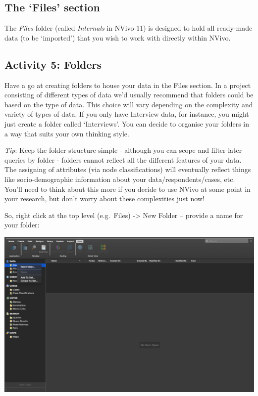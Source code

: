 \documentclass[
]{book}
\begin{document}
\hypertarget{the-files-section}{%
\subsection{The `Files' section}\label{the-files-section}}

The \emph{Files} folder (called \emph{Internals} in NVivo 11) is designed to hold all ready-made data (to be `imported') that you wish to work with directly within NVivo.

\hypertarget{activity-5-folders}{%
\subsection{Activity 5: Folders}\label{activity-5-folders}}

Have a go at creating folders to house your data in the Files section. In a project consisting of different types of data we'd usually recommend that folders could be based on the type of data. This choice will vary depending on the complexity and variety of types of data. If you only have Interview data, for instance, you might just create a folder called `Interviews'. You can decide to organise your folders in a way that suits your own thinking style.

\emph{Tip}: Keep the folder structure simple - although you can scope and filter later queries by folder - folders cannot reflect all the different features of your data. The assigning of attributes (via node classifications) will eventually reflect things like socio-demographic information about your data/respondents/cases, etc. You'll need to think about this more if you decide to use NVivo at some point in your research, but don't worry about these complexities just now!

So, right click at the top level (e.g.~Files) -\textgreater{} New Folder -- provide a name for your folder:

\includegraphics{imgs/new_folder.png}
\end{document}
